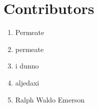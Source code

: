 \section{Contributors}
\begin{enumerate}
	\item Permeate
	\item permeate
	\item i dunno
	\item aljedaxi
	\item Ralph Waldo Emerson
\end{enumerate}